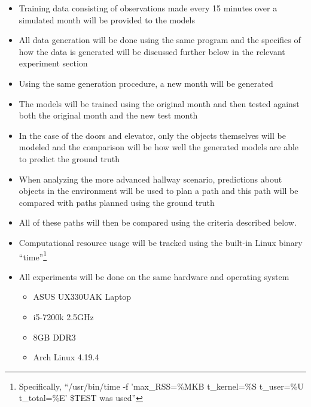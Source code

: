   \begin{itemize}

    \item Training data consisting of observations made every 15 minutes over
          a simulated month will be provided to the models

    \item All data generation will be done using the same program and the
          specifics of how the data is generated will be discussed further
          below in the relevant experiment section

    \item Using the same generation procedure, a new month will be generated

    \item The models will be trained using the original month and then tested
          against both the original month and the new test month

    \item In the case of the doors and elevator, only the objects themselves
          will be modeled and the comparison will be how well the generated
          models are able to predict the ground truth

    \item When analyzing the more advanced hallway scenario, predictions about
          objects in the environment will be used to plan a path and this path
          will be compared with paths planned using the ground truth

    \item All of these paths will then be compared using the criteria described
          below.

    \item Computational resource usage will be tracked using the built-in Linux
      binary ``time''\footnote[1]{Specifically, ``/usr/bin/time -f 'max\_RSS=\%MKB t\_kernel=\%S t\_user=\%U t\_total=\%E' \$TEST was used''}


    \item All experiments will be done on the same hardware and operating system
      \begin{itemize}
        \item ASUS UX330UAK Laptop
        \item i5-7200k 2.5GHz
        \item 8GB DDR3
        \item Arch Linux 4.19.4
      \end{itemize}

  \end{itemize}

